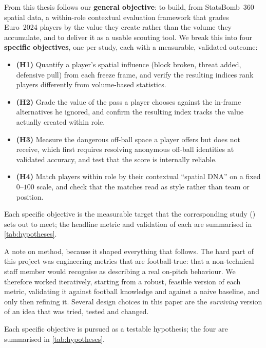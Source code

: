 \documentclass[12pt,a4paper]{article}
\begin{document}
From this thesis follows our \textbf{general objective}: to build, from StatsBomb~360 spatial data, a within-role contextual evaluation framework that grades Euro~2024 players by the value they create rather than the volume they accumulate, and to deliver it as a usable scouting tool. We break this into four \textbf{specific objectives}, one per study, each with a measurable, validated outcome:
\begin{itemize}
    \item \textbf{(H1)} Quantify a player's spatial influence (block broken, threat added, defensive pull) from each freeze frame, and verify the resulting indices rank players differently from volume-based statistics.
    \item \textbf{(H2)} Grade the value of the pass a player chooses against the in-frame alternatives he ignored, and confirm the resulting index tracks the value actually created within role.
    \item \textbf{(H3)} Measure the dangerous off-ball space a player offers but does not receive, which first requires resolving anonymous off-ball identities at validated accuracy, and test that the score is internally reliable.
    \item \textbf{(H4)} Match players within role by their contextual ``spatial DNA'' on a fixed $0$--$100$ scale, and check that the matches read as style rather than team or position.
\end{itemize}
Each specific objective is the measurable target that the corresponding study () sets out to meet; the headline metric and validation of each are summarised in \cref{tab:hypotheses}.

A note on method, because it shaped everything that follows.
The hard part of this project was engineering metrics that are football-true: that a non-technical staff member would recognise as describing a real on-pitch behaviour.
We therefore worked iteratively, starting from a robust, feasible version of each metric, validating it against football knowledge and against a naive baseline, and only then refining it.
Several design choices in this paper are the \emph{surviving} version of an idea that was tried, tested and changed.

Each specific objective is pursued as a testable hypothesis; the four are summarised in \cref{tab:hypotheses}.
\end{document}
